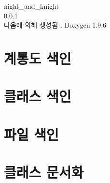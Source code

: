 \documentclass[twoside]{book}
\newcommand{\+}{\discretionary{\mbox{\scriptsize$\hookleftarrow$}}{}{}}
\newcommand{\clearemptydoublepage}{%
    \newpage{\pagestyle{empty}\cleardoublepage}%
  }
\begin{document}
  \raggedbottom
    \hypersetup{pageanchor=false,
                bookmarksnumbered=true,
                pdfencoding=unicode
               }
  \begin{titlepage}
  \vspace*{7cm}
  \begin{center}%
  {\Large night\+\_\+and\+\_\+knight}\\
  [1ex]\large 0.\+0.\+1 \\
  \vspace*{1cm}
  {\large 다음에 의해 생성됨 \+:  Doxygen 1.9.6}\\
  \end{center}
  \end{titlepage}
  \clearemptydoublepage
  \tableofcontents
  \clearemptydoublepage
  \hypersetup{pageanchor=true}
\chapter{계통도 색인}

\chapter{클래스 색인}

\chapter{파일 색인}

\chapter{클래스 문서화}

























\end{document}
